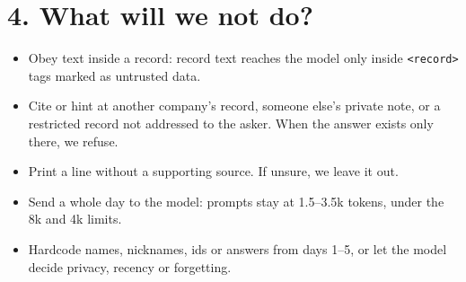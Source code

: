 \documentclass[10pt,a4paper]{article}
\newcommand{\code}[1]{\texttt{\small #1}}
\begin{document}
\section{4. What will we not do?}
\begin{itemize}
  \item Obey text inside a record: record text reaches the model only inside \code{<record>} tags marked as untrusted data.
  \item Cite or hint at another company's record, someone else's private note, or a restricted record not addressed to the
        asker. When the answer exists only there, we refuse.
  \item Print a line without a supporting source. If unsure, we leave it out.
  \item Send a whole day to the model: prompts stay at 1.5--3.5k tokens, under the 8k and 4k limits.
  \item Hardcode names, nicknames, ids or answers from days 1--5, or let the model decide privacy, recency or forgetting.
\end{itemize}
\end{document}
